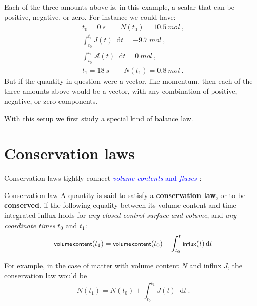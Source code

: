 \documentclass[a4paper,12pt,%
onecolumn,oneside,%
british%
]{memoir}
\renewcommand*{\bm}[1]{\textpdfrender{TextRenderingMode=2,LineWidth=0.2pt}{\boldsymbol{#1}}}
\newcommand*{\di}{\mathop{}\!\mathrm{d}}%
\renewcommand*{\|}[1][]{\nonscript\:#1\vert\nonscript\:\mathopen{}}
\newcommand*{\sect}{\S}%
\renewcommand*{\autoref}[3][\sect\,\ref]{\textcolor{blue}{#3}
\raisebox{0.6ex}{\color{blue}\miniscule%
\faIcon{angle-right}%
\;#1{#2}\;p.\,\pageref{#2}}}
\newcommand*{\yti}{t_{0}}
\newcommand*{\ytf}{t_{1}}
\newcommand*{\dt}{\di t}
\newcommand*{\yN}{N}
\newcommand*{\yJ}{J}
\newcommand*{\ya}{\mathcal{A}}
\begin{document}
Each of the three amounts above is, in this example, a scalar that can be positive, negative, or zero. For instance we could have:
\begin{equation*}
  \begin{gathered}
    \yti = \qty{0}{s} \qquad \yN(\yti) = \qty{10.5}{mol}\ ,
    \\[1ex]
    \int_{\yti}^{\ytf}\!\!\yJ(t)\dt = \qty{-9.7}{mol} \ ,
    \\[1ex]
    \int_{\yti}^{\ytf}\!\!\ya(t)\dt = \qty{0}{mol} \ ,
    \\[1ex]
    \ytf = \qty{18}{s} \qquad \yN(\ytf) = \qty{0.8}{mol} \ .
  \end{gathered}
\end{equation*}
But if the quantity in question were a vector, like momentum, then each of the three amounts above would be a vector, with any combination of positive, negative, or zero components.


\medskip

With this setup we first study a special kind of balance law.

\section{Conservation laws}
\label{sec:conservation_laws}

Conservation laws tightly connect \autoref{cha:contents_fluxes}{\emph{volume contents} and \emph{fluxes}}:

\begin{definition}{Conservation law}
  A quantity is said to satisfy a \textbf{conservation law}, or to be \textbf{conserved}, if the following equality between its volume content and time-integrated influx holds for \emph{any closed control surface and volume}, and \emph{any coordinate times} $\yti$ and $\ytf$:
  \begin{equation}
    \label{eq:conserved}
    \textsf{\footnotesize volume\,content}(\ytf) =
    \textsf{\footnotesize volume\,content}(\yti) +
    \int_{\yti}^{\ytf}\!\!\textsf{\footnotesize influx}(t)\dt
  \end{equation}
\end{definition}
For example, in the case of matter with volume content $\yN$ and influx $\yJ$, the conservation law would be
\begin{equation*}
  \yN(\ytf) = \yN(\yti) + \int_{\yti}^{\ytf}\!\!\yJ(t)\dt \ .
\end{equation*}
\end{document}
